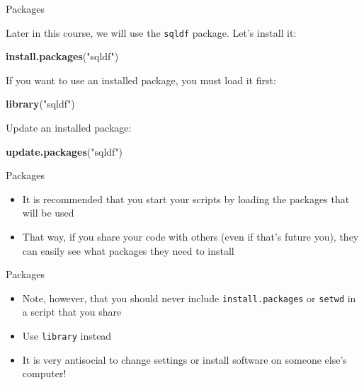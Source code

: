 \documentclass[ignorenonframetext,]{beamer}
\newenvironment{Shaded}{\begin{snugshade}}{\end{snugshade}}
\newcommand{\KeywordTok}[1]{\textcolor[rgb]{0.13,0.29,0.53}{\textbf{#1}}}
\newcommand{\NormalTok}[1]{#1}
\newcommand{\StringTok}[1]{\textcolor[rgb]{0.31,0.60,0.02}{#1}}
\begin{document}
\begin{frame}[fragile]{Packages}
\protect\hypertarget{packages-1}{}

Later in this course, we will use the \texttt{sqldf} package. Let's
install it:

\begin{Shaded}
\begin{Highlighting}[]
\KeywordTok{install.packages}\NormalTok{(}\StringTok{"sqldf"}\NormalTok{)}
\end{Highlighting}
\end{Shaded}

If you want to use an installed package, you must load it first:

\begin{Shaded}
\begin{Highlighting}[]
\KeywordTok{library}\NormalTok{(}\StringTok{"sqldf"}\NormalTok{)}
\end{Highlighting}
\end{Shaded}

Update an installed package:

\begin{Shaded}
\begin{Highlighting}[]
\KeywordTok{update.packages}\NormalTok{(}\StringTok{"sqldf"}\NormalTok{) }
\end{Highlighting}
\end{Shaded}

\end{frame}

\begin{frame}{Packages}
\protect\hypertarget{packages-2}{}

\begin{itemize}
\item
  It is recommended that you start your scripts by loading the packages
  that will be used
\item
  That way, if you share your code with others (even if that's future
  you), they can easily see what packages they need to install
\end{itemize}

\end{frame}

\begin{frame}[fragile]{Packages}
\protect\hypertarget{packages-3}{}

\begin{itemize}
\item
  Note, however, that you should never include \texttt{install.packages}
  or \texttt{setwd} in a script that you share
\item
  Use \texttt{library} instead
\item
  It is very antisocial to change settings or install software on
  someone else's computer!
\end{itemize}

\end{frame}
\end{document}

